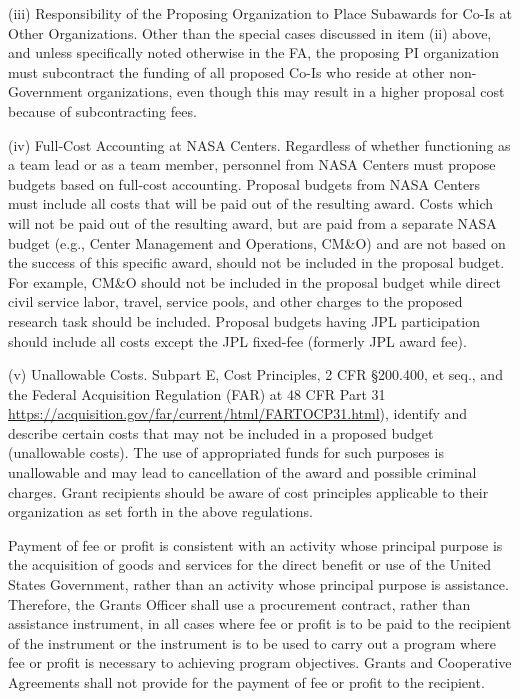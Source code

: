 \documentclass[12pt]{article}
\begin{document}
(iii) Responsibility of the Proposing Organization to Place Subawards
for Co-Is at Other Organizations. Other than the special cases
discussed in item (ii) above, and unless specifically noted otherwise
in the FA, the proposing PI organization must subcontract the funding
of all proposed Co-Is who reside at other non-Government
organizations, even though this may result in a higher proposal cost
because of subcontracting fees.

(iv) Full-Cost Accounting at NASA Centers. Regardless of whether
functioning as a team lead or as a team member, personnel from NASA
Centers must propose budgets based on full-cost accounting. Proposal
budgets from NASA Centers must include all costs that will be paid out
of the resulting award. Costs which will not be paid out of the
resulting award, but are paid from a separate NASA budget (e.g.,
Center Management and Operations, CM\&O) and are not based on the
success of this specific award, should not be included in the proposal
budget. For example, CM\&O should not be included in the proposal
budget while direct civil service labor, travel, service pools, and
other charges to the proposed research task should be
included. Proposal budgets having JPL participation should include all
costs except the JPL fixed-fee (formerly JPL award fee).

(v) Unallowable Costs. Subpart E, Cost Principles, 2 CFR \S200.400, et
seq., and the Federal Acquisition Regulation (FAR) at 48 CFR Part 31
\url{https://acquisition.gov/far/current/html/FARTOCP31.html}), identify and
describe certain costs that may not be included in a proposed budget
(unallowable costs). The use of appropriated funds for such purposes
is unallowable and may lead to cancellation of the award and possible
criminal charges. Grant recipients should be aware of cost principles
applicable to their organization as set forth in the above
regulations.

Payment of fee or profit is consistent with an activity whose
principal purpose is the acquisition of goods and services for the
direct benefit or use of the United States Government, rather than an
activity whose principal purpose is assistance. Therefore, the Grants
Officer shall use a procurement contract, rather than assistance
instrument, in all cases where fee or profit is to be paid to the
recipient of the instrument or the instrument is to be used to carry
out a program where fee or profit is necessary to achieving program
objectives. Grants and Cooperative Agreements shall not provide for
the payment of fee or profit to the recipient.
\end{document}
